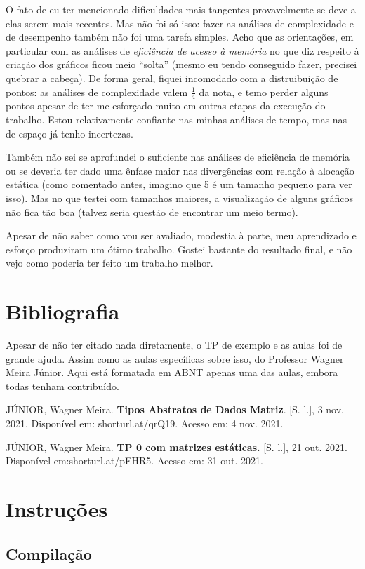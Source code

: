 \documentclass{article}
\begin{document}
O fato de eu ter mencionado dificuldades mais tangentes provavelmente se deve a elas serem mais recentes. Mas não foi só isso: fazer as análises de complexidade e de desempenho também não foi uma tarefa simples. Acho que as orientações, em particular com as análises de \textit{eficiência de acesso à memória} no que diz respeito à criação dos gráficos ficou meio ``solta'' (mesmo eu tendo conseguido fazer, precisei quebrar a cabeça). De forma geral, fiquei incomodado com a distruibuição de pontos: as análises de complexidade valem \( \frac{1}{4} \) da nota, e temo perder alguns pontos apesar de ter me esforçado muito em outras etapas da execução do trabalho. Estou relativamente confiante nas minhas análises de tempo, mas nas de espaço já tenho incertezas.

Também não sei se aprofundei o suficiente nas análises de eficiência de memória ou se deveria ter dado uma ênfase maior nas divergências com relação à alocação estática (como comentado antes, imagino que 5 é um tamanho pequeno para ver isso). Mas no que testei com tamanhos maiores, a visualização de alguns gráficos não fica tão boa (talvez seria questão de encontrar um meio termo).

Apesar de não saber como vou ser avaliado, modestia à parte, meu aprendizado e esforço produziram um ótimo trabalho. Gostei bastante do resultado final, e não vejo como poderia ter feito um trabalho melhor.

\section{Bibliografia}
Apesar de não ter citado nada diretamente, o TP de exemplo e as aulas foi de grande ajuda. Assim como as aulas específicas sobre isso, do Professor Wagner Meira Júnior. Aqui está formatada em ABNT apenas uma das aulas, embora todas tenham contribuído.

JÚNIOR, Wagner Meira. \textbf{Tipos Abstratos de Dados Matriz}. [S. l.], 3 nov. 2021. Disponível em: shorturl.at/qrQ19. Acesso em: 4 nov. 2021.

JÚNIOR, Wagner Meira. \textbf{TP 0 com matrizes estáticas.} [S. l.], 21 out. 2021. Disponível em:shorturl.at/pEHR5. Acesso em: 31 out. 2021.

\newpage

\section*{Instruções}

\subsection*{Compilação}
\end{document}
